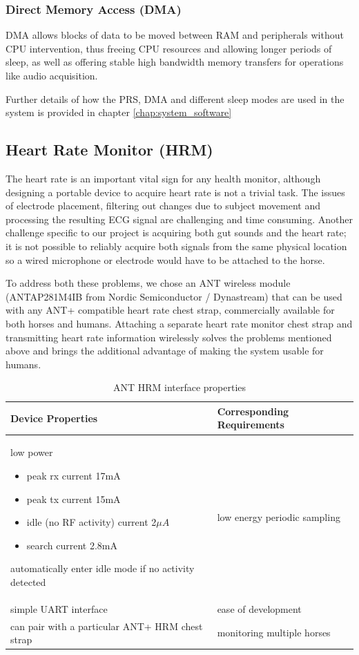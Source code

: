 \subsubsection*{Direct Memory Access (DMA)} DMA allows blocks of data to be moved between RAM and peripherals without CPU intervention, thus freeing CPU resources and allowing longer periods of sleep, as well as offering stable high bandwidth memory transfers for operations like audio acquisition.

Further details of how the PRS, DMA and different sleep modes are used in the system is provided in chapter \ref{chap:system_software}


\subsection{Heart Rate Monitor (HRM)}
The heart rate is an important vital sign for any health monitor, although designing a portable device to acquire heart rate is not a trivial task. The issues of electrode placement, filtering out changes due to subject movement and processing the resulting ECG signal are challenging and time consuming. Another challenge specific to our project is acquiring both gut sounds and the heart rate; it is not possible to reliably acquire both signals from the same physical location so a wired microphone or electrode would have to be attached to the horse. 

To address both these problems, we chose an ANT wireless module (ANTAP281M4IB from Nordic Semiconductor / Dynastream) that can be used with any ANT+ compatible heart rate chest strap, commercially available for both horses and humans. Attaching a separate heart rate monitor chest strap and transmitting heart rate information wirelessly solves the problems mentioned above and brings the additional advantage of making the system usable for humans.


\begin{table}[htb]
\centering
\begin{tabular}{|m{}|m{}|}
\hline 
	\textbf{Device Properties} &
	\textbf{Corresponding Requirements}  \\ 
\hline
	low power  
	\begin{itemize}
	\item peak rx current 17mA
	\item peak tx current 15mA
	\item idle (no RF activity) current 2$\mu A$
	\item search current 2.8mA
	\end{itemize}
	automatically enter idle mode if no activity detected
	&
	low energy periodic sampling  \\ 
\hline
	simple UART interface &
	ease of development \\
\hline
	can pair with a particular ANT+ HRM chest strap &
	monitoring multiple horses \\
\hline 
\end{tabular} 
\caption{ANT HRM interface properties}
\label{tab:ant_properties}
\end{table}

